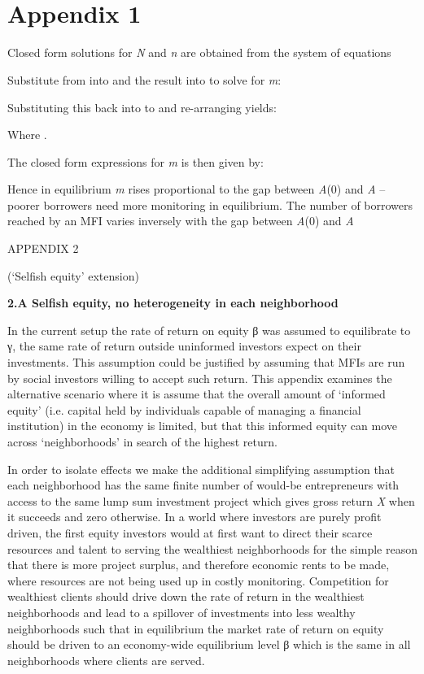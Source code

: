 \documentclass{article}
\begin{document}
\section{\texorpdfstring{\\
Appendix 1}{ Appendix 1}}\label{appendix-1}

Closed form solutions for \emph{N} and \emph{n} are obtained from the
system of equations



Substitute from into and the result into to solve for \emph{m}:

Substituting this back into to and re-arranging yields:

Where .

The closed form expressions for \emph{m} is then given by:

Hence in equilibrium \emph{m} rises proportional to the gap between
\emph{\emph{A}}(0) and \emph{A} -- poorer borrowers need more monitoring
in equilibrium. The number of borrowers reached by an MFI varies
inversely with the gap between \emph{\emph{A}}(0) and \emph{A}

APPENDIX 2

(`Selfish equity' extension)

\textbf{2.A Selfish equity, no heterogeneity in each neighborhood}

In the current setup the rate of return on equity β was assumed to
equilibrate to γ, the same rate of return outside uninformed investors
expect on their investments. This assumption could be justified by
assuming that MFIs are run by social investors willing to accept such
return. This appendix examines the alternative scenario where it is
assume that the overall amount of `informed equity' (i.e. capital held
by individuals capable of managing a financial institution) in the
economy is limited, but that this informed equity can move across
`neighborhoods' in search of the highest return.

In order to isolate effects we make the additional simplifying
assumption that each neighborhood has the same finite number of would-be
entrepreneurs with access to the same lump sum investment project which
gives gross return \emph{X} when it succeeds and zero otherwise. In a
world where investors are purely profit driven, the first equity
investors would at first want to direct their scarce resources and
talent to serving the wealthiest neighborhoods for the simple reason
that there is more project surplus, and therefore economic rents to be
made, where resources are not being used up in costly monitoring.
Competition for wealthiest clients should drive down the rate of return
in the wealthiest neighborhoods and lead to a spillover of investments
into less wealthy neighborhoods such that in equilibrium the market rate
of return on equity should be driven to an economy-wide equilibrium
level β which is the same in all neighborhoods where clients are served.
\end{document}
